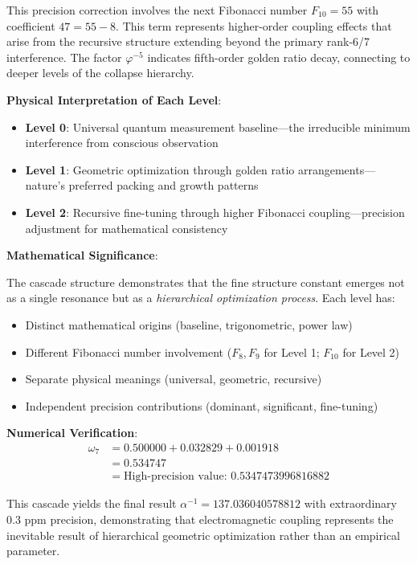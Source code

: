 \documentclass[%
 reprint,
 amsmath,amssymb,
 aps,
 prd,
 10pt,
 nofootinbib,      %
 longbibliography  %
]{revtex4-2}
\theoremstyle{definition}
\theoremstyle{remark}
\begin{document}
This precision correction involves the next Fibonacci number $F_{10} = 55$ with coefficient $47 = 55 - 8$. This term represents higher-order coupling effects that arise from the recursive structure extending beyond the primary rank-6/7 interference. The factor $\varphi^{-5}$ indicates fifth-order golden ratio decay, connecting to deeper levels of the collapse hierarchy.

\textbf{Physical Interpretation of Each Level}:

\begin{itemize}
\item \textbf{Level 0}: Universal quantum measurement baseline—the irreducible minimum interference from conscious observation
\item \textbf{Level 1}: Geometric optimization through golden ratio arrangements—nature's preferred packing and growth patterns
\item \textbf{Level 2}: Recursive fine-tuning through higher Fibonacci coupling—precision adjustment for mathematical consistency
\end{itemize}

\textbf{Mathematical Significance}:

The cascade structure demonstrates that the fine structure constant emerges not as a single resonance but as a \emph{hierarchical optimization process}. Each level has:
\begin{itemize}
\item Distinct mathematical origins (baseline, trigonometric, power law)
\item Different Fibonacci number involvement ($F_8, F_9$ for Level 1; $F_{10}$ for Level 2)
\item Separate physical meanings (universal, geometric, recursive)
\item Independent precision contributions (dominant, significant, fine-tuning)
\end{itemize}

\textbf{Numerical Verification}:
\begin{align}
\omega_7 &= 0.500000 + 0.032829 + 0.001918 \\
&= 0.534747 \\
&= \text{High-precision value: } 0.5347473996816882
\end{align}

This cascade yields the final result $\alpha^{-1} = 137.036040578812$ with extraordinary 0.3 ppm precision, demonstrating that electromagnetic coupling represents the inevitable result of hierarchical geometric optimization rather than an empirical parameter.
\end{document}
